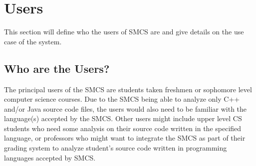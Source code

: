 \documentclass{scrreprt}
\begin{document}
	\chapter{Users}
	This section will define who the users of SMCS are and give details on the use case of the system.
	\section{Who are the Users?}
	The principal users of the SMCS are students taken freshmen or sophomore level computer science courses. Due to the SMCS being able to analyze only C++ and/or Java source code files, the users would also need to be familiar with the language(s) accepted by the SMCS. Other users might include upper level CS students who need some analysis on their source code written in the specified language, or professors who might want to integrate the SMCS as part of their grading system to analyze student’s source code written in programming languages accepted by SMCS.
\end{document}
